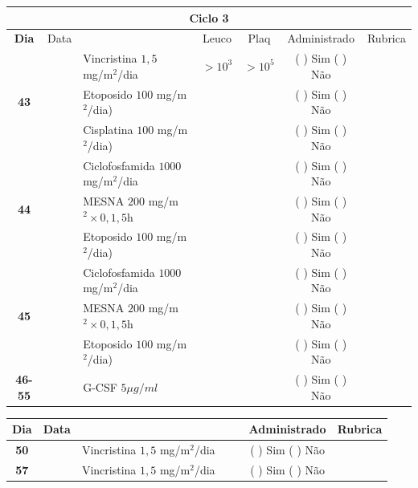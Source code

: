 \documentclass[11pt,a4paper,oldfontcommands]{memoir}
\begin{document}
\begin{center}
\clearpage
\begin{longtable}{p{1cm}c|p{5cm}|p{1.5cm}p{1.5cm}|c|c}
	\hline
	\multicolumn{7}{c}{Ciclo 3} \\
	\hline
	\multicolumn{1}{c|}{\multirow{1}{*}{\textbf{Dia}}}&{Data}&{}&\multicolumn{1}{c|}{Leuco}&\multicolumn{1}{c|}{Plaq}&{Administrado}&{Rubrica} \\
    \hline
    \multicolumn{1}{c|}{\multirow{3}{*}{\textbf{43}}}&&{Vincristina \(1,5\) mg/m\(^2\)/dia}&\multicolumn{1}{c|}{\(>10^3\)}&\multicolumn{1}{c|}{\(>10^5\)}&{(  ) Sim (  ) Não}&\\
    \cline{4-5}
    \multicolumn{1}{c|}{}&&{Etoposido \(100\) mg/m\(^2\)/dia)}&&&{(  ) Sim (  ) Não}&\\
    \cline{4-5}
    \multicolumn{1}{c|}{}&\multirow{1}{*}{}&{Cisplatina \(100\) mg/m\(^2\)/dia)}&&&{(  ) Sim (  ) Não}&\\
    \hline
    \multicolumn{1}{c|}{\multirow{3}{*}{\textbf{44}}}&&{Ciclofosfamida \(1000\) mg/m\(^2\)/dia}&{}&&{(  ) Sim (  ) Não}&\\
    \multicolumn{1}{c|}{}&&{MESNA \(200\) mg/m\(^2 \times 0,1,5\)h}&&&{(  ) Sim (  ) Não}&\\
    \multicolumn{1}{c|}{}&&{Etoposido \(100\) mg/m\(^2\)/dia)}&&&{(  ) Sim (  ) Não}&\\
    \hline
    \multicolumn{1}{c|}{\multirow{3}{*}{\textbf{45}}}&&{Ciclofosfamida \(1000\) mg/m\(^2\)/dia}&{}&&{(  ) Sim (  ) Não}&\\
    \multicolumn{1}{c|}{}&&{MESNA \(200\) mg/m\(^2 \times 0,1,5\)h}&&&{(  ) Sim (  ) Não}&\\
    \multicolumn{1}{c|}{}&\multirow{1}{*}{}&{Etoposido \(100\) mg/m\(^2\)/dia)}&{}&&{(  ) Sim (  ) Não}&\\
    \hline
    \multicolumn{1}{c|}{\textbf{46-55}}&&{G-CSF \(5 \mu g/ml\) }&&&{(  ) Sim (  ) Não}&\\
    \hline
\end{longtable}

\begin{longtable}{p{1cm}c|p{4cm}|p{2cm}p{2cm}|c|c}
	\hline
	\multicolumn{1}{c|}{\multirow{1}{*}{\textbf{Dia}}}&{Data}&{}&{}&&{Administrado}&{Rubrica} \\
    \hline
    \multicolumn{1}{c|}{\textbf{50}}&&{Vincristina \(1,5\) mg/m\(^2\)/dia}&\multicolumn{1}{c}{}&&{(  ) Sim (  ) Não}&\\
    \hline
    \multicolumn{1}{c|}{\textbf{57}}&&{Vincristina \(1,5\) mg/m\(^2\)/dia}&\multicolumn{1}{c}{}&&{(  ) Sim (  ) Não}&\\
    \hline
\end{longtable}


\end{center}
\end{document}
